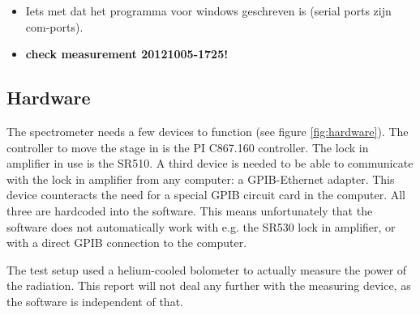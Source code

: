 \begin{itemize}
\item Iets met dat het programma voor windows geschreven is (serial ports zijn com-ports).
\item \textbf{check measurement 20121005-1725!}
\end{itemize}

\subsection{Hardware}

The spectrometer needs a few devices to function (see figure \ref{fig:hardware}). The controller to move the stage in is the PI C867.160 controller. The lock in amplifier in use is the SR510. A third device is needed to be able to communicate with the lock in amplifier from any computer: a GPIB-Ethernet adapter. This device counteracts the need for a special GPIB circuit card in the computer. All three are hardcoded into the software. This means unfortunately that the software does not automatically work with e.g. the SR530 lock in amplifier, or with a direct GPIB connection to the computer.

The test setup used a helium-cooled bolometer to actually measure the power of the radiation. This report will not deal any further with the measuring device, as the software is independent of that.


